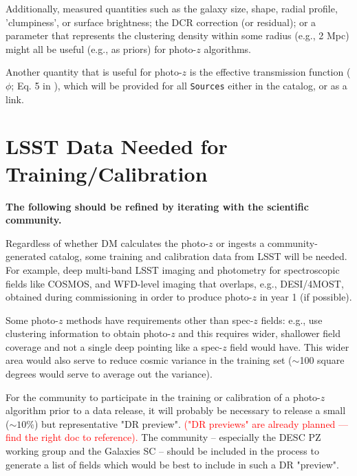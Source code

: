 \documentclass[DM,lsstdraft,toc]{lsstdoc}
\begin{document}
Additionally, measured quantities such as the galaxy size, shape, radial profile, 'clumpiness', or surface brightness; the DCR correction (or residual); or a parameter that represents the clustering density within some radius (e.g., 2 Mpc) might all be useful (e.g., as priors) for photo-$z$ algorithms. 

Another quantity that is useful for photo-$z$ is the effective transmission function ($\phi$; Eq. 5 in ), which will be provided for all {\tt Sources} either in the catalog, or as a link.





\clearpage
\section{LSST Data Needed for Training/Calibration}\label{sec:calib}

{\bf The following should be refined by iterating with the scientific community.}

Regardless of whether DM calculates the photo-$z$ or ingests a community-generated catalog, some training and calibration data from LSST will be needed.
For example, deep multi-band LSST imaging and photometry for spectroscopic fields like COSMOS, and WFD-level imaging that overlaps, e.g., DESI/4MOST, obtained during commissioning in order to produce photo-$z$ in year 1 (if possible).

Some photo-$z$ methods have requirements other than spec-$z$ fields: e.g., \citet{2019MNRAS.483.2801S} use clustering information to obtain photo-$z$ and this requires wider, shallower field coverage and not a single deep pointing like a spec-$z$ field would have. 
This wider area would also serve to reduce cosmic variance in the training set ($\sim$100 square degrees would serve to average out the variance).

For the community to participate in the training or calibration of a photo-$z$ algorithm prior to a data release, it will probably be necessary to release a small ($\sim10\%$) but representative "DR preview". \textcolor{red}{("DR previews" are already planned --- find the right doc to reference).}
The community -- especially the DESC PZ working group and the Galaxies SC -- should be included in the process to generate a list of fields which would be best to include in such a DR "preview".


\clearpage
\end{document}
